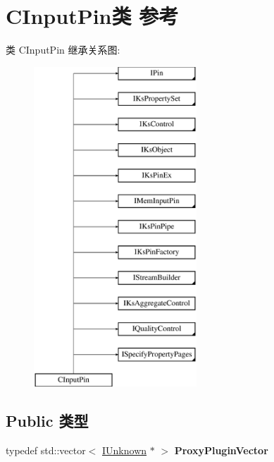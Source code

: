 \hypertarget{class_c_input_pin}{}\section{C\+Input\+Pin类 参考}
\label{class_c_input_pin}
类 C\+Input\+Pin 继承关系图\+:\begin{figure}[H]
\begin{center}
\leavevmode
\includegraphics[height=12.000000cm]{class_c_input_pin}
\end{center}
\end{figure}
\subsection*{Public 类型}
\begin{DoxyCompactItemize}
\item 
\mbox{\label{class_c_input_pin_a2c9e358b981a24d73ddf010ad7fdc04c}} 
typedef std\+::vector$<$ \hyperlink{interface_i_unknown}{I\+Unknown} $\ast$ $>$ {\bfseries Proxy\+Plugin\+Vector}
\end{DoxyCompactItemize}
